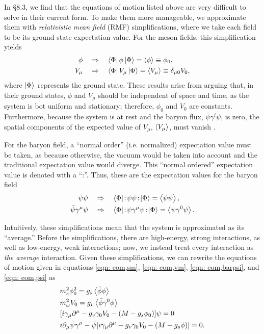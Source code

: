 In \autocite{diener_2008} \S 8.3, we find that the equations of motion listed above are very difficult to solve in their current form. To make them more manageable, we approximate them with \textit{relativistic mean field} (RMF) simplifications, where we take each field to be its ground state expectation value. For the meson fields, this simplification yields
\begin{align}
    \phi &\quad\Rightarrow\quad \bra{\Phi} \phi \ket{\Phi} = \expval{\phi} \equiv \phi_0, \\
    V_\mu & \quad\Rightarrow\quad \bra{\Phi} V_\mu \ket{\Phi} = \expval{V_\mu} \equiv \delta_{\mu 0} V_0,
\end{align}
where $\ket{\Phi}$ represents the ground state. These results arise from arguing that, in their ground states, $\phi$ and $V_\mu$ should be independent of space and time, as the system is bot uniform and stationary; therefore, $\phi_0$ and $V_0$ are constants. Furthermore, because the system is at rest and the baryon flux, $\bar\psi\gamma^i\psi$, is zero, the spatial components of the expected value of $V_\mu$, $\expval{V_\mu}$, must vanish \autocite{diener_2008}. 

For the baryon field, a ``normal order'' (i.e. normalized) expectation value must be taken, as because otherwise, the vacuum would be taken into account and the traditional expectation value would diverge. This ``normal ordered'' expectation value is denoted with a ``:''. Thus, these are the expectation values for the baryon field
\begin{align}
    \bar\psi\psi &\goesto \bra{\Phi}\!:\!\psi\psi\!:\!\ket{\Phi} = \expval{\bar\psi\psi},\\
    \bar\psi\gamma^\mu \psi &\goesto \bra{\Phi}\!:\!\psi\gamma^\mu\psi\!:\!\ket{\Phi} = \expval{\psi\gamma^0\psi}.
\end{align}

Intuitively, these simplifications mean that the system is approximated as its ``average.'' Before the simplifications, there are high-energy, strong interactions, as well as low-energy, weak interactions; now, we instead treat every interaction as \textit{the average} interaction. Given these simplifications, we can rewrite the equations of motion given in equations \eqref{eqn: eom,sm}, \eqref{eqn: eom,vm}, \eqref{eqn: eom,barpsi}, and \eqref{eqn: eom,psi} as
\begin{align}
    & m_s^2 \phi_0^2 = g_s\expval{\bar\phi\phi}\label{eqn: qhd1, expval phi0 eom}\\
    & m_\omega^2 V_0 = g_v\expval{\bar\phi\gamma^0\phi}\label{eqn: qhd1, expval V0 eom}\\
    & \bqty{i\gamma_\mu\p^\mu - g_v\gamma_0 V_0 - (M - g_s\phi_0)}\psi = 0\\
    & i \p_\mu \bar\psi \gamma^\mu -\bar\psi\bqty{i\gamma_\mu\p^\mu - g_v \gamma_0V_0 - (M-g_s\phi)} = 0.
\end{align}

